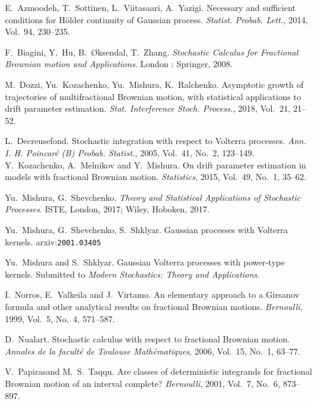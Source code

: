 \documentclass{article}
\theoremstyle{plain}
\theoremstyle{remark}
\theoremstyle{definition}
\begin{document}
\begin{thebibliography}{8}


   E.~Azmoodeh, T.~Sottinen, L.~Viitasaari, A.~Yazigi.
   Necessary and sufficient conditions for {H\"older} continuity of
   {Gaussian} process.
   \textit{Statist. Probab. Lett.}, 2014, Vol.~94, 230--235.

    F.~Biagini, Y.~Hu, B.~{\O}ksendal, T.~Zhang.
    \textit{Stochastic Calculus for Fractional {Brownian} motion
	and Applications}.
	London : Springer, 2008.




		M.~Dozzi, Yu.~Kozachenko, Yu.~Mishura, K.~Ralchenko.
		Asymptotic growth of trajectories of multifractional
		Brownian motion, with statistical applications to
		drift parameter estimation.
		\textit{Stat. Interference Stoch. Process.},
		2018, Vol.~21, 21--52.

L.~Decreusefond.
Stochastic integration with respect to Volterra processes.
\textit{Ann. I. H. Poincar\'e (B) Probab. Statist.}, 2005, Vol.~41, No.~2, 123--149.
		Y.~Kozachenko, A.~Melnikov and Y.~Mishura.
		On drift parameter estimation in models with fractional Brownian motion.
		\textit{Statistics}, 2015, Vol.~49, No.~1, 35--62.

		Yu.~Mishura, G.~Shevchenko.
		\textit{Theory and Statistical Applications of Stochastic Processes}.
		ISTE, London, 2017; Wiley, Hoboken, 2017.

Yu.~Mishura, G.~Shevchenko, S.~Shklyar.
Gaussian processes with Volterra kernels.
arxiv:\texttt{2001.03405}

		Yu.~Mishura and S.~Shklyar.
		Gaussian Volterra processes with power-type kernels.
		Submitted to \textit{Modern Stochastics: Theory and Applications}.
		
		I.~Norros, E.~Valkeila and J.~Virtamo.
		An elementary approach to a Girsanov formula and
		other analytical results on fractional Brownian motions.
		\textit{Bernoulli}, 1999, Vol.~5, No.~4, 571--587.

		D.~Nualart.
		Stochastic calculus with respect to
		fractional Brownian motion.
		\textit{Annales de la facult\'e de
		Toulouse Math\'ematiques},
		2006, Vol.~15, No.~1, \mbox{63--77}.



		V.~Papirasand M.~S.~Taqqu.
		Are classes of deterministic integrands
		for fractional Brownian motion
		of an interval complete?
		\textit{Bernoulli}, 2001, Vol.~7, No.~6, 873--897.

\end{thebibliography}
\end{document}

